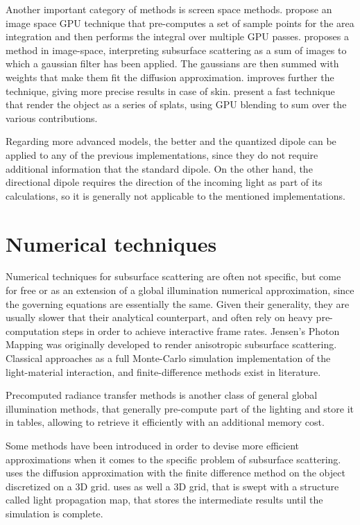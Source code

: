 Another important category of methods is screen space methods. \cite{1238246} propose an image space GPU technique that pre-computes a set of sample points for the area integration and then performs the integral over multiple GPU passes. \cite{d'Eon:2007:ERH:2383847.2383869} proposes a method in image-space, interpreting subsurface scattering as a sum of images to which a gaussian filter has been applied. The gaussians are then summed with weights that make them fit the diffusion approximation. \cite{Jimenez:2009:SPR:1609967.1609970} improves further the technique, giving more precise results in case of skin. \cite{4736459} present a fast technique that render the object as a series of splats, using GPU blending to sum over the various contributions.

Regarding more advanced models, the better and the quantized dipole can be applied to any of the previous implementations, since they do not require additional information that the standard dipole. On the other hand, the directional dipole requires the direction of the incoming light as part of its calculations, so it is generally not applicable to the mentioned implementations.  

\section{Numerical techniques}

Numerical techniques for subsurface scattering are often not specific, but come for free or as an extension of a global illumination numerical approximation, since the governing equations are essentially the same. Given their generality, they are usually slower that their analytical counterpart, and often rely on heavy pre-computation steps in order to achieve interactive frame rates. Jensen's Photon Mapping\citep{Jensen:1998:ESL:280814.280925} was originally developed to render anisotropic subsurface scattering. Classical approaches as a full Monte-Carlo simulation implementation of the light-material interaction\citep{Dorsey:1999:MRW:311535.311560}, and finite-difference methods exist in literature\citep{raey}. 

Precomputed radiance transfer methods is another class of general global illumination methods, that generally pre-compute part of the lighting and store it in tables\citep{Donner:2009:EBM:1531326.1531336}, allowing to retrieve it efficiently with an additional memory cost.  

Some methods have been introduced in order to devise more efficient approximations when it comes to the specific problem of subsurface scattering. \cite{raey} uses the diffusion approximation with the finite difference method on the object discretized on a 3D grid. \cite{Fattal:2009:PMI:1477926.1477933} uses as well a 3D grid, that is swept with a structure called light propagation map, that stores the intermediate results until the simulation is complete. 

